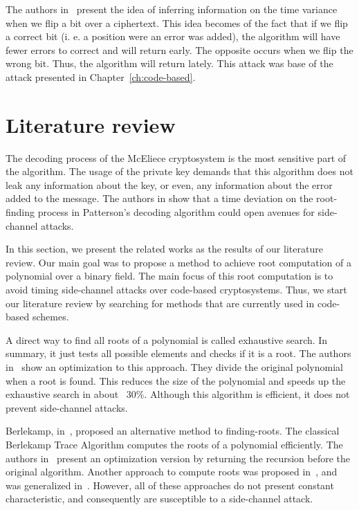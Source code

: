The authors in~\cite{shoufan2009timing} present the idea of inferring information on the time variance when we flip a bit over a ciphertext. This idea becomes of the fact that if we flip a correct bit (i. e. a position were an error was added), the algorithm will have fewer errors to correct and will return early. The opposite occurs when we flip the wrong bit. Thus, the algorithm will return lately. This attack was base of the attack presented in Chapter~\ref{ch:code-based}.


\section{Literature review}
The decoding process of the McEliece cryptosystem is the most sensitive part of the algorithm. The usage of the private key demands that this algorithm does not leak any information about the key, or even, any information about the error added to the message. The authors in \cite{bucerzan2017improved} show that a time deviation on the root-finding process in Patterson's decoding algorithm could open avenues for side-channel attacks. 

In this section, we present the related works as the results of our literature review. Our main goal was to propose a method to achieve root computation of a polynomial over a binary field. The main focus of this root computation is to avoid timing side-channel attacks over code-based cryptosystems. Thus, we start our literature review by searching for methods that are currently used in code-based schemes.

A direct way to find all roots of a polynomial is called exhaustive search. In summary, it just tests all possible elements and checks if it is a root. The authors in~\cite{strenzke2012fast} show an optimization to this approach. They divide the original polynomial when a root is found. This reduces the size of the polynomial and speeds up the exhaustive search in about ~30\%. Although this algorithm is efficient, it does not prevent side-channel attacks.

Berlekamp, in~\cite{berlekamp1970factoring}, proposed an alternative method to finding-roots. The classical Berlekamp Trace Algorithm computes the roots of a polynomial efficiently. The authors in~\cite{strenzke2012fast} present an optimization version by returning the recursion before the original algorithm. Another approach to compute roots was proposed in~\cite{fedorenko2002finding}, and was generalized in~\cite{Skachek2008, biswas2009}. However, all of these approaches do not present constant characteristic, and consequently are susceptible to a side-channel attack.

